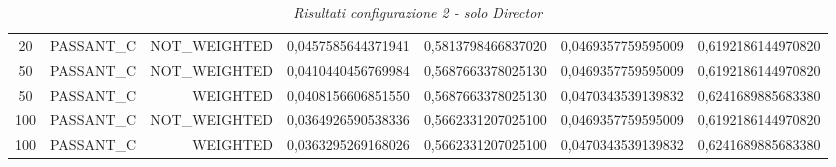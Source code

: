 \begin{table}[H]
{\begin{tabular}{ c l r c c c c }
				20 &  PASSANT\_C & NOT\_WEIGHTED & 0,0457585644371941 & 0,5813798466837020 & 0,0469357759595009 & 0,6192186144970820 \\
				
				50 &  PASSANT\_C & NOT\_WEIGHTED & 0,0410440456769984 & 0,5687663378025130 & 0,0469357759595009 & 0,6192186144970820 \\
				
				50 &  PASSANT\_C &   WEIGHTED & 0,0408156606851550 & 0,5687663378025130 & 0,0470343539139832 & 0,6241689885683380 \\
				
				100 &  PASSANT\_C & NOT\_WEIGHTED & 0,0364926590538336 & 0,5662331207025100 & 0,0469357759595009 & 0,6192186144970820 \\
				
				100 &  PASSANT\_C &   WEIGHTED & 0,0363295269168026 & 0,5662331207025100 & 0,0470343539139832 & 0,6241689885683380 \\			
			\bottomrule
		\end{tabular}  
	}
	\caption{\emph{Risultati configurazione 2 - solo Director}}
\end{table}

